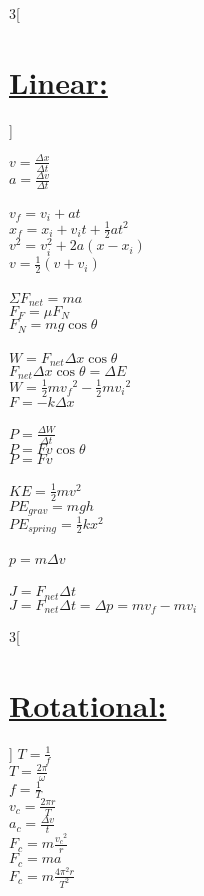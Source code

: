 \documentclass{article}[16pt]
\begin{document}
\begin{multicols}{3}[\section*{\underline {Linear:}}]

$v = \frac{\Delta x}{\Delta t}$\\
$a = \frac{\Delta v}{\Delta t}$\\
\\
$v_f = v_i + at$\\
$x_f = x_i + v_it + \frac{1}{2}at^2$\\
$v^2 = v_i^2 + 2a(x - x_i)$\\
$v = \frac{1}{2}(v + v_i)$\\
\\
$\Sigma F_{net} = ma$\\
$F_{F} = \mu F_{N}$\\
$F_{N} = mg\cos\theta$\\
\\
$W = F_{net}\Delta x\cos\theta$\\
$ F_{net}\Delta x\cos\theta = \Delta E$\\
$W = \frac{1}{2}m{v_f}^2 - \frac{1}{2}m{v_i}^2$\\
$F = -k\Delta x$\\
\\
$P = \frac{\Delta W}{\Delta t}$\\
$P = Fv\cos\theta$\\
$P = Fv$\\
\\
$KE = \frac{1}{2}mv^2$\\
$PE_{grav} = mgh$\\
$PE_{spring} = \frac{1}{2}kx^2$\\
\\
$p  = m\Delta v$\\
\\
$J = F_{net}\Delta t$\\
$J = F_{net}\Delta t = \Delta p =mv_f - mv_i$
\end{multicols}
\begin{multicols}{3}[\section*{\underline {Rotational:}}]
$T = \frac{1}{f}$\\
$T = \frac{2\pi}{\omega}$\\
$f = \frac{1}{T}$\\
$v_c = \frac{2\pi r}{T}$\\
$a_c = \frac{\Delta v}{t}$\\
$F_c = m\frac{{v_c}^2}{r}$\\
$F_c = ma$\\
$F_c = m\frac{4{\pi}^2r}{T^2}$\\
\end{multicols}
\end{document}
